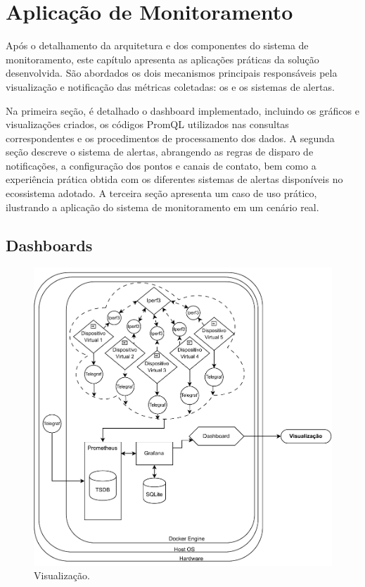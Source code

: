 \chapter{Aplicação de Monitoramento}
\label{chap4}

{\color{red}
Após o detalhamento da arquitetura e dos componentes do sistema de monitoramento, este capítulo apresenta as aplicações práticas da solução desenvolvida. São abordados os dois mecanismos principais responsáveis pela visualização e notificação das métricas coletadas: os  e os sistemas de alertas.

Na primeira seção, é detalhado o dashboard implementado, incluindo os gráficos e visualizações criados, os códigos PromQL utilizados nas consultas correspondentes e os procedimentos de processamento dos dados. A segunda seção descreve o sistema de alertas, abrangendo as regras de disparo de notificações, a configuração dos pontos e canais de contato, bem como a experiência prática obtida com os diferentes sistemas de alertas disponíveis no ecossistema adotado. A terceira seção apresenta um caso de uso prático, ilustrando a aplicação do sistema de monitoramento em um cenário real.

\section{Dashboards}
\label{section:Dashboards}

\begin{figure}[h]
\centering
\setlength{\abovecaptionskip}{-20pt}
\includegraphics[width=\textwidth]{Imagens/chap04/by-blocks/dashboard_diagram.pdf}
\caption{Visualização.}
\label{fig:DiagramaVisualizacao}
\end{figure}


}





